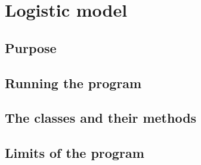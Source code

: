 \section{Logistic model}

\subsection{Purpose}

\subsection{Running the program}

\subsection{The classes and their methods}

\subsection{Limits of the program}




